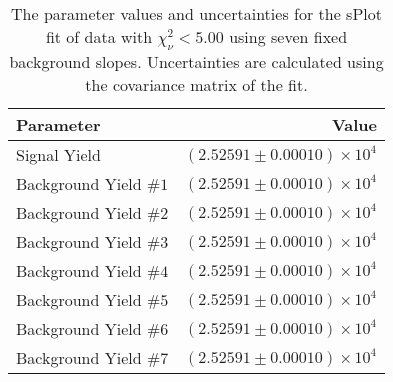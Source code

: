 
\begin{table}[ht]
    \begin{center}
        \begin{tabular}{lr}\toprule
            Parameter & Value \\\midrule
            Signal Yield & $(2.52591 \pm 0.00010) \times 10^{4}$ \\
            Background Yield $\#1$ & $(2.52591 \pm 0.00010) \times 10^{4}$ \\
            Background Yield $\#2$ & $(2.52591 \pm 0.00010) \times 10^{4}$ \\
            Background Yield $\#3$ & $(2.52591 \pm 0.00010) \times 10^{4}$ \\
            Background Yield $\#4$ & $(2.52591 \pm 0.00010) \times 10^{4}$ \\
            Background Yield $\#5$ & $(2.52591 \pm 0.00010) \times 10^{4}$ \\
            Background Yield $\#6$ & $(2.52591 \pm 0.00010) \times 10^{4}$ \\
            Background Yield $\#7$ & $(2.52591 \pm 0.00010) \times 10^{4}$ \\\bottomrule
        \end{tabular}
        \caption{The parameter values and uncertainties for the sPlot fit of data with $\chi^2_\nu < 5.00$ using seven fixed background slopes. Uncertainties are calculated using the covariance matrix of the fit.}\label{tab:splot-fit-results-chisqdof-5.00-fixed-7}
    \end{center}
\end{table}
